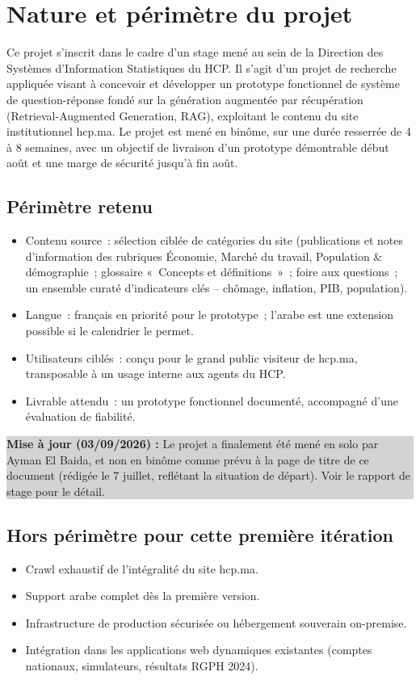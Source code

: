 \documentclass[11pt,a4paper]{article}
\newcommand{\majcadrage}[1]{%
\par\vspace{0.35cm}
\noindent\colorbox{lightgrey}{%
\begin{minipage}{\dimexpr\linewidth-2\fboxsep}
\vspace{0.15cm}
\textbf{\color{gold}Mise \`a jour (03/09/2026) :} #1
\vspace{0.15cm}
\end{minipage}%
}
\vspace{0.35cm}
}
\begin{document}
\section{Nature et p\'erim\`etre du projet}
Ce projet s'inscrit dans le cadre d'un stage men\'e au sein de la Direction des Syst\`emes d'Information Statistiques du HCP. Il s'agit d'un projet de recherche appliqu\'ee visant \`a concevoir et d\'evelopper un prototype fonctionnel de syst\`eme de question-r\'eponse fond\'e sur la g\'en\'eration augment\'ee par r\'ecup\'eration (Retrieval-Augmented Generation, RAG), exploitant le contenu du site institutionnel hcp.ma. Le projet est men\'e en bin\^ome, sur une dur\'ee resserr\'ee de 4 \`a 8 semaines, avec un objectif de livraison d'un prototype d\'emontrable d\'ebut ao\^ut et une marge de s\'ecurit\'e jusqu'\`a fin ao\^ut.

\subsection{P\'erim\`etre retenu}
\begin{itemize}
\item Contenu source~: s\'election cibl\'ee de cat\'egories du site (publications et notes d'information des rubriques \'Economie, March\'e du travail, Population \& d\'emographie~; glossaire «~Concepts et d\'efinitions~»~; foire aux questions~; un ensemble curat\'e d'indicateurs cl\'es -- ch\^omage, inflation, PIB, population).
\item Langue~: fran\c{c}ais en priorit\'e pour le prototype~; l'arabe est une extension possible si le calendrier le permet.
\item Utilisateurs cibl\'es~: con\c{c}u pour le grand public visiteur de hcp.ma, transposable \`a un usage interne aux agents du HCP.
\item Livrable attendu~: un prototype fonctionnel document\'e, accompagn\'e d'une \'evaluation de fiabilit\'e.
\end{itemize}

\majcadrage{Le projet a finalement \'et\'e men\'e en solo par Ayman El Baida, et non en bin\^ome comme pr\'evu \`a la page de titre de ce document (r\'edig\'ee le 7 juillet, refl\'etant la situation de d\'epart). Voir le rapport de stage pour le d\'etail.}

\subsection{Hors p\'erim\`etre pour cette premi\`ere it\'eration}
\begin{itemize}
\item Crawl exhaustif de l'int\'egralit\'e du site hcp.ma.
\item Support arabe complet d\`es la premi\`ere version.
\item Infrastructure de production s\'ecuris\'ee ou h\'ebergement souverain on-premise.
\item Int\'egration dans les applications web dynamiques existantes (comptes nationaux, simulateurs, r\'esultats RGPH 2024).
\end{itemize}
\end{document}
